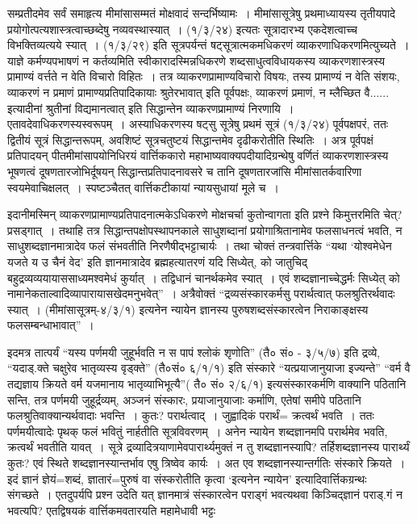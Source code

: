 {सम्प्रतीदमेव सर्वं समाहृत्य मीमांसासम्मतं मोक्षवादं सन्दर्भिष्यामः~। मीमांसासूत्रेषु प्रथमाध्यायस्य तृतीयपादे प्रयोगोत्पत्यशास्त्रत्वाच्छब्देषु नव्यवस्थास्यात्~। (१/३/२४) इत्यतः सूत्रादारभ्य एकदेशत्वाच्च विभक्तिव्यत्यये स्यात्~। (१/३/२९) इति सूत्रपर्यन्तं षट्सूत्रात्मकमधिकरणं व्याकरणाधिकरणमित्युच्यते~।  याज्ञे कर्मण्यपभाषणं न कर्तव्यमिति स्वीकारादस्मिन्नधिकरणे शब्दसाधुत्वविधायकस्य व्याकरणशास्त्रस्य प्रामाण्यं वर्त्तते न वेति विचारो विहितः~। तत्र व्याकरणप्रामाण्यविचारो विषयः, तस्य प्रामाण्यं न वेति संशयः, व्याकरणं न प्रमाणं प्रामाण्यप्रतिपादिकायाः श्रुतेरभावात् इति पूर्वपक्षः, व्याकरणं प्रमाणं, न म्लैच्छित वै...... इत्यादीनां श्रुतीनां विद्यमानत्वात् इति सिद्धान्तेन व्याकरणप्रामाण्यं निरणायि~। एतावदेवाधिकरणस्यस्वरूपम्~। अस्याधिकरणस्य षट्सु सूत्रेषु प्रथमं सूत्रं (१/३/२४) पूर्वपक्षपरं, ततः द्वितीयं सूत्रं सिद्धान्तरूपम्, अवशिष्टं सूत्रचतुष्टयं सिद्धान्तमेव दृढीकरोतीति स्थितिः~। अत्र पूर्वपक्षं प्रतिपादयन् पीतमीमांसापयोनिधिरयं वार्त्तिककारो महाभाष्यवाक्यपदीयादिग्रन्थेषु वर्णितं व्याकरणशास्त्रस्य भूषणत्वं दूषणतारजोभिर्दूषयन् सिद्धान्तप्रतिपादनावसरे च तानि दूषणतारजांसि मीमांसातर्कवारिणा स्वयमेवाचिक्षलत्~। स्पष्टञ्चैतत् वार्त्तिकटीकायां न्यायसुधायां मूले च~। 

इदानीमस्मिन् व्याकरणप्रामाण्यप्रतिपादनात्मकेऽधिकरणे मोक्षचर्चा कुतोन्वागता इति प्रश्ने किमुत्तरमिति चेत्? प्रसड्गात्~। तथाहि तत्र सिद्धान्तपक्षोपस्थापनकाले साधुशब्दानां प्रयोगाश्रितानामेव फलसाधनत्वं भवति, न साधुशब्दज्ञानमात्रादेव फलं संभवतीति निरणैषीद्भट्टाचार्यः~। तथा चोक्तं तन्त्रवार्त्तिके “यथा ‘योश्वमेधेन यजते य उ चैनं वेद’ इति ज्ञानमात्रादेव ब्रह्महत्यातरणं यदि सिध्येत्, को जातुचिद् बहुद्रव्यव्ययायाससाध्यमश्वमेधं कुर्यात्~। तद्विधानं चानर्थकमेव स्यात्~। एवं शब्दज्ञानाच्चेद्धर्मः सिध्येत् को नामानेकताल्वादिव्यापारायासखेदमनुभवेत्”~। अत्रैवोक्तं “द्रव्यसंस्कारकर्मसु परार्थत्वात् फलश्रुतिरर्थवादः स्यात्~। (मीमांसासूत्रम्-४/३/१) इत्यनेन न्यायेन ज्ञानस्य पुरुषशब्दसंस्कारत्वेन निराकाङ्क्षस्य फल\-सम्बन्धाभावात्”~। 

इदमत्र तात्पर्यं  “यस्य पर्णमयी जुहूर्भवति न स पापं श्लोकं शृणोति” (तै० सं० - ३/५/७) इति द्रव्ये, “यदाड्.क्ते चक्षुरेव भातृव्यस्य वृड्क्ते” (तै०सं० ६/­१/१) इति संस्कारे “यत्प्रयाजानुयाजा इज्यन्ते” “वर्म वै तद्यज्ञाय क्रियते वर्म यजमानाय भातृव्याभिभूत्यै”\break ( तै० सं० २/६/१) इत्यसंस्कारकर्मणि वाक्यानि पठितानि सन्ति, तत्र पर्णमयी जुहूर्द्रव्यम्, अञ्जनं संस्कारः, प्रयाजानुयाजाः कर्माणि, एतेषां समीपे पठितानि फलश्रुतिवाक्यान्यर्थवादाः भवन्ति~। कुतः? परार्थत्वाद्~। जुह्वादिकं परार्थं= क्रत्वर्थं भवति~। ततः पर्णमयीत्वादेः पृथक् फलं भवितुं नार्हतीति सूत्रविवरणम्~। अनेन न्यायेन शब्दज्ञानमपि परार्थमेव भवति, क्रत्वर्थं भवतीति यावत्~। सूत्रे द्रव्यादित्रयाणामेवपारार्थ्यमुक्तं न तु शब्दज्ञानस्यापि? तर्हिशब्दज्ञानस्य पारार्थ्यं कुतः? एवं स्थिते शब्दज्ञानस्यान्तर्भाव एषु त्रिष्वेव कार्यः~। अत एव शब्दज्ञानस्यान्तर्गतिः संस्कारे क्रियते~। इदं ज्ञानं ज्ञेयं=शब्दं, ज्ञातारं=पुरुषं वा संस्करोतीति कृत्वा ‘इत्यनेन न्यायेन’ इत्यादिवार्त्तिकग्रन्थः संगच्छते~। एतदुपर्यपि प्रश्न उदेति यत् ज्ञानमात्रं संस्कारत्वेन पराड्गं भवत्यथवा किञ्चिद्ज्ञानं पराड्.गं न भवत्यपि? एतद्विषयकं वार्त्तिकमवतारयति महामेधावी भट्टः 

}
